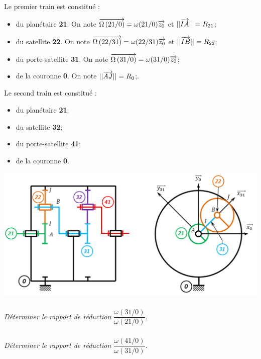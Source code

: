 \documentclass[10pt,fleqn]{article} %
\begin{document}
\begin{multicols}{2}
Le premier train est constitué :
\begin{itemize}
\item du planétaire \textbf{21}. On note $\overrightarrow{\Omega\left( {21}/{0}\right)}=\omega(21/0)\overrightarrow{z_0}$ et $||\overrightarrow{IA}|| =R_{21} $;
\item du satellite \textbf{22}. On note $\overrightarrow{\Omega\left( {22}/{31}\right)}=\omega(22/31)\overrightarrow{z_0}$ et $||\overrightarrow{IB}|| =R_{22}$;
\item du porte-satellite \textbf{31}. On note $\overrightarrow{\Omega\left( {31}/{0}\right)}=\omega(31/0)\overrightarrow{z_0}$;
\item de la couronne \textbf{0}. On note  $||\overrightarrow{AJ}|| =R_{0}$;.
\end{itemize}
Le second train est constitué :
\begin{itemize}
\item du planétaire \textbf{21};
\item du satellite \textbf{32};
\item du porte-satellite \textbf{41};
\item de la couronne \textbf{0}.
\end{itemize}

\begin{center}
\includegraphics[width=\linewidth]{images/A6_train}
\end{center}

\subparagraph{}
\textit{Déterminer le rapport de réduction $\dfrac{\omega(31/0)}{\omega(21/0)}$.}

\subparagraph{}
\textit{Déterminer le rapport de réduction $\dfrac{\omega(41/0)}{\omega(31/0)}$.}



\end{multicols}
\end{document}
